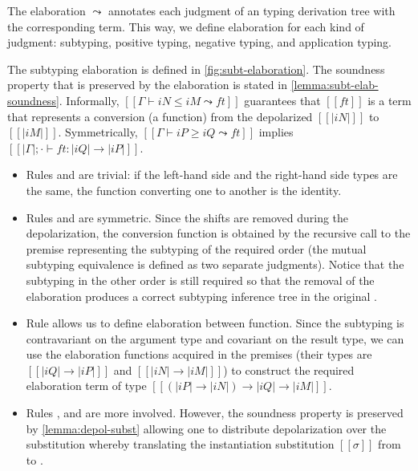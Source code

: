 The elaboration \fexists $\leadsto$ \systemf
annotates each judgment of an \fexists typing derivation tree
with the corresponding \systemf term. This way, 
we define elaboration for each kind of judgment:
subtyping, positive typing, negative typing, and application typing.

The subtyping elaboration is defined in \cref{fig:subt-elaboration}.
The soundness property that is preserved by the elaboration is stated in
\cref{lemma:subt-elab-soundness}. Informally, $[[Γ ⊢ iN ≤ iM ⤳ ft]]$
guarantees that $[[ft]]$ is a \systemf term that represents 
a conversion (\ie a function) from the depolarized $[[|iN|]]$ to $[[|iM|]]$.
Symmetrically, $[[Γ ⊢ iP ≥ iQ ⤳ ft]]$ implies $[[|Γ| ; · ⊢ ft : |iQ| → |iP| ]]$.
\begin{itemize}
  \item Rules  and  
    are trivial: if the left-hand side and the right-hand side types are the 
    same, the function converting one to another is the identity.
  \item Rules  and 
    are symmetric. Since the shifts are removed during the depolarization,
    the conversion function is obtained by the recursive call to the 
    premise representing the subtyping of the required order
    (the mutual subtyping equivalence is defined as two separate judgments).
    Notice that the subtyping in the other order is still required
    so that the removal of the elaboration produces a correct
    subtyping inference tree in the original \fexists.
  \item Rule  allows us to
    define elaboration between function. Since the subtyping is 
    contravariant on the argument type and covariant on the result type,
    we can use the elaboration functions acquired in the premises
    (their types are $[[|iQ| → |iP|]]$ and $[[|iN| → |iM|]]$)
    to construct the required elaboration term of type 
    $[[(|iP| → |iN|) → |iQ| → |iM|]]$.
  \item Rules 
    , and 
    are more involved. However, the soundness property is preserved
    by \cref{lemma:depol-subst} allowing one to distribute
    depolarization over the substitution whereby
    translating the instantiation substitution $[[σ]]$ from \fexists to \systemf.
\end{itemize}


